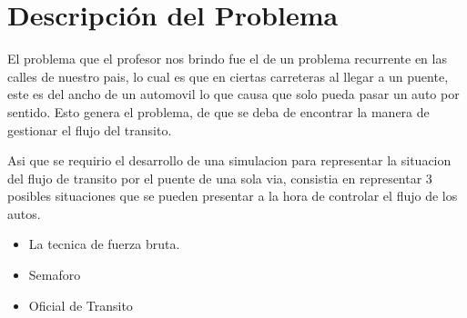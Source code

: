 \documentclass[10pt,a4paper]{article}
\begin{document}
\section{Descripción del Problema}
El problema que el profesor nos brindo fue el de un problema recurrente en las calles de nuestro pais, lo cual es que en ciertas  carreteras al llegar a un puente, este es del ancho de un automovil lo que causa que solo pueda pasar un auto por sentido. 
Esto genera el problema, de que se deba de encontrar la manera de gestionar el flujo del transito.

Asi que se requirio el desarrollo de una simulacion para representar la situacion del flujo de transito por el puente de una sola via, consistia en representar 3 posibles situaciones que se pueden presentar a la hora de controlar el flujo de los autos. 
\begin{itemize}
\item La tecnica de fuerza bruta.
\item Semaforo
\item Oficial de Transito 
\end{itemize}
\end{document}
